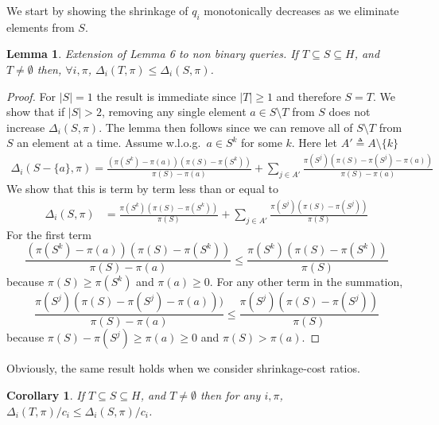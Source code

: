 \documentclass{article}
\newtheorem{lemma}{Lemma}
\newtheorem{corollary}{Corollary}
\begin{document}
We start by showing the shrinkage of
$q_i$ monotonically decreases as we eliminate elements from $S$.
\begin{lemma}Extension of Lemma 6 \citep{greedy} to non binary queries.  
If $T \subseteq S \subseteq H$,
and $T \neq \emptyset$ then, $\forall i, \pi$,  $\Delta_i(T,
\pi) \leq \Delta_i(S, \pi)$. \label{mondeclma} \end{lemma}
\begin{proof}
For $|S| = 1$ the result is immediate since $|T| \geq 1$ and therefore $S = T$.
We show that if $|S| > 2$, removing any single element $a \in S \setminus T$ 
from $S$ does not increase $\Delta_i(S, \pi)$.  
The lemma then follows since we can
remove all of $S \setminus T$ from $S$ an element at a time. 
Assume w.l.o.g.\ $a \in S^k$ for some $k$. Here let $A' 
\triangleq A \setminus \lbrace k \rbrace$
\begin{align*} 
\Delta_i(S-\lbrace a \rbrace, \pi)  = 
\frac{(\pi(S^k) - \pi(a))(\pi(S) - \pi(S^k))}{\pi(S) - \pi(a)}  
+ \sum_{j \in A'} \frac{\pi(S^j)(\pi(S)-\pi(S^j)-\pi(a))}{\pi(S)-\pi(a)}
\end{align*}
We show that this is term by term less than or equal to
\begin{align*}
\Delta_i(S, \pi) & =  \frac{\pi(S^k)(\pi(S) - \pi(S^k))}{\pi(S)} 
+  \sum_{j \in A'} \frac{\pi(S^j)(\pi(S) - \pi(S^j))}{\pi(S)}
\end{align*}
For the first term 
\[ \frac{(\pi(S^k) - \pi(a))(\pi(S) - \pi(S^k))}{\pi(S) - \pi(a)} 
\leq \frac{\pi(S^k)(\pi(S) - \pi(S^k))}{\pi(S)}\]
because $\pi(S) \geq \pi(S^k)$ and $\pi(a) \geq 0$.
For any other term in the summation,
\[ \frac{\pi(S^j)(\pi(S) - \pi(S^j) - \pi(a)))}{\pi(S) - \pi(a)} 
\leq \frac{\pi(S^j)(\pi(S) - \pi(S^j))}{\pi(S)}\]
because $\pi(S) - \pi(S^j) \geq \pi(a) \geq 0$ and $\pi(S) > \pi(a)$.
\end{proof}
Obviously, the same result holds when we consider shrinkage-cost
ratios.
\begin{corollary} If $T \subseteq S \subseteq H$,
and $T \neq \emptyset$ then for any $i, \pi$,  $\Delta_i(T,
\pi) / c_i \leq \Delta_i(S, \pi) / c_i$. \label{mondeccor} \end{corollary}
\end{document}
